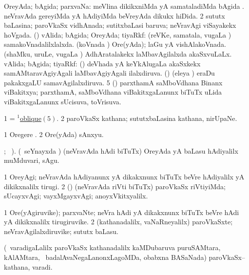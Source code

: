 \bentry
{}
\gl{\gu}
\bmng
% 
\bnum
{} OreyAda; bAgida; parxvaNa: 
\banum
{} meVlina dikikxniMda yA samataladiMda bAgida . 
 neVravAda gereyiMda yA hAdiyiMda beVreyAda dikukx hiDida. 
\eanum
\numie
\num{2} sututx baLasina; paroVkaSx vidhAnada; sutitxbaLasi baruva; neVravAgi viSayakekx hoVgada. 
 (\jAyx) vAlida; bAgida; OreyAda; tiyaRkf: 
\banum
{} (reVKe, samatala, \mo vugaLa \vi) samakoVnadalilxlalxda. 
 (koVnada \vi) Ore(yAda); laGu yA vishAlakoVnada. 
 (shaMku, uruLe, \mo vugaLa \vi) AdhAratalakekx laMbavAgilalxda akaSxvuLaLx. 
\eanum
\numie
{} vAlida; bAgida; tiyaRkf: 
\banum
{} (\aMrashA) deVhada yA keYkAlugaLa akaSxkekx samAMtaravAgiyAgali laMbavAgiyAgali ilalxdiruva. 
 (\savi) (eleya \vi) eraDu pakakxgaLU samavAgilalxdiruva. 
\hypertarget{oblique(1)5}{} 
\eanum
\numie
\num{5} (\vAyx) parxthamA saMboVdhana Binanx viBakitxya; parxthamA, saMboVdhana viBakitxgaLanunx biTuTx uLida viBakitxgaLanunx sUcisuva, toVrisuva. 
\enum
\emng

\noindent
\gl{\pagu}
\bmng
\bnum
\num{1}  = \hyperlink{oblique(1)5}{$^1$oblique\((5)\)}. 
\num{2}  paroVkaSx kathana; sututxbaLasina kathana, nirUpaNe. 
\enum
\emng
\eentry

\bentry
{}
\gl{\nA}
\bmng
% 
\bnum
\num{1} Oregere \eng{$(/)$}. 
\num{2} Ore(yAda) sAnxyu. 
\enum
\emng
\eentry

\bentry
{}
\gl{\akirx}
; \vakaq\ ).\bmng
(\kanmu\ seYnayxda \vi) (neVravAda hAdi biTuTx) OreyAda yA baLasu hAdiyalilx muMduvari, sAgu. 
\emng
\eentry

\bentry
{}
\gl{\kirxvi}
\bmng
\bnum
\num{1} OreyAgi; neVravAda hAdiyanunx yA dikakxnunx biTuTx beVre hAdiyalilx yA dikikxnalilx tirugi. 
\num{2} (\rUpa) (neVravAda riVti biTuTx) paroVkaSx riVtiyiMda; sUcayxvAgi; vayxMgayxvAgi; anoyxVkitxyalilx. 
\enum
\emng
\eentry

\bentry
{}
\gl{\nA}
\bmng
\bnum
\num{1} Ore(yAgiruvike); parxvaNte; neVra hAdi yA dikakxnunx biTuTx beVre hAdi yA dikikxnalilx tirugiruvike. 
\num{2} (kathanadalilx, vaNaRneyalilx) paroVkaSxte; neVravAgilalxdiruvike; sututx baLasu. 
\enum
\emng
\eentry

\bentry
{}
\gl{\nA}
\bmng
(\sA\ varadigaLalilx paroVkaSx kathanadalilx kaMDubaruva puruSAMtara, kAlAMtara, \mo\ badalAvaNegaLanonxLagoMDa, obabxna BASaNada) paroVkaSx--kathana, varadi. 
\emng
\eentry

